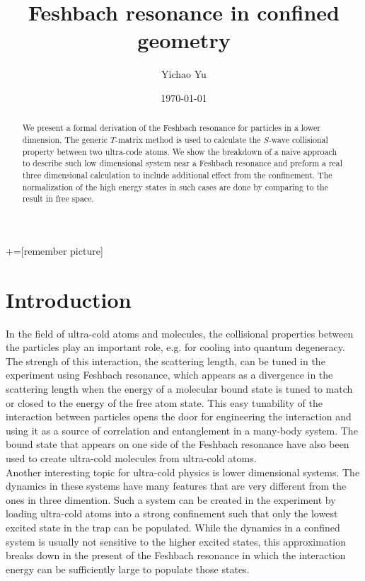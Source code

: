 \documentclass[aps,twocolumn,secnumarabic,balancelastpage,amsmath,amssymb,nofootinbib]{revtex4}
\begin{document}
+=[remember picture]
\title{Feshbach resonance in confined geometry}
\author{Yichao Yu}
\date{\today}

\begin{abstract}
  We present a formal derivation of the Feshbach resonance for particles in a lower dimension. The generic $T$-matrix method is used to calculate the $S$-wave collisional property between two ultra-code atoms. We show the breakdown of a naive approach to describe such low dimensional system near a Feshbach resonance and preform a real three dimensional calculation to include additional effect from the confinement. The normalization of the high energy states in such cases are done by comparing to the result in free space.
\end{abstract}

\maketitle
\section*{Introduction}
In the field of ultra-cold atoms and molecules, the collisional properties between the particles play an important role, e.g. for cooling into quantum degeneracy. The strengh of this interaction, the scattering length, can be tuned in the experiment using Feshbach resonance, which appears as a divergence in the scattering length when the energy of a molecular bound state is tuned to match or closed to the energy of the free atom state. This easy tunability of the interaction between particles opens the door for engineering the interaction and using it as a source of correlation and entanglement in a many-body system. The bound state that appears on one side of the Feshbach resonance have also been used to create ultra-cold molecules from ultra-cold atoms.\cite{jila-krb}\\

Another interesting topic for ultra-cold physics is lower dimensional systems. The dynamics in these systems have many features that are very different from the ones in three dimention. Such a system can be created in the experiment by loading ultra-cold atoms into a strong confinement such that only the lowest excited state in the trap can be populated. While the dynamics in a confined system is usually not sensitive to the higher excited states, this approximation breaks down in the present of the Feshbach resonance in which the interaction energy can be sufficiently large to populate those states.\\
\end{document}
